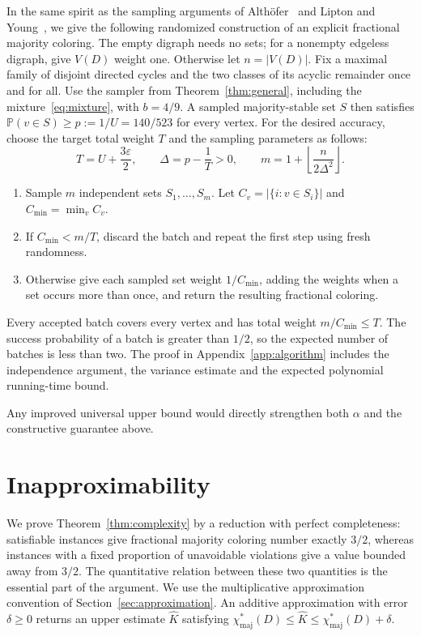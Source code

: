 \documentclass[12pt]{article}
\newcommand{\Pp}{\mathbb P}
\newcommand{\chif}{\chi^*_{\mathrm{maj}}}
\newcommand{\abs}[1]{|#1|}
\begin{document}
In the same spirit as the sampling arguments of Alth\"ofer~\cite{Althofer} and Lipton and Young~\cite{LiptonYoung}, we give the following randomized construction of an explicit fractional majority coloring. The empty digraph needs no sets; for a nonempty edgeless digraph, give \(V(D)\) weight one. Otherwise let \(n=\abs{V(D)}\). Fix a maximal family of disjoint directed cycles and the two classes of its acyclic remainder once and for all. Use the sampler from Theorem~\ref{thm:general}, including the mixture~\eqref{eq:mixture}, with \(b=4/9\). A sampled majority-stable set \(S\) then satisfies \(\Pp(v\in S)\ge p:=1/U=140/523\) for every vertex. For the desired accuracy, choose the target total weight $T$ and the sampling parameters as follows:
\begin{equation}\label{eq:batchparameters}
T=U+\frac{3\varepsilon}{2},\qquad
\Delta=p-\frac1T>0,\qquad
m=1+\left\lfloor\frac{n}{2\Delta^2}\right\rfloor.
\end{equation}
\begin{enumerate}
\item Sample \(m\) independent sets \(S_1,\ldots,S_m\). Let \(C_v=\abs{\{i:v\in S_i\}}\) and \(C_{\min}=\min_v C_v\).
\item If \(C_{\min}<m/T\), discard the batch and repeat the first step using fresh randomness.
\item Otherwise give each sampled set weight \(1/C_{\min}\), adding the weights when a set occurs more than once, and return the resulting fractional coloring.
\end{enumerate}
Every accepted batch covers every vertex and has total weight \(m/C_{\min}\le T\). The success probability of a batch is greater than \(1/2\), so the expected number of batches is less than two. The proof in Appendix~\ref{app:algorithm} includes the independence argument, the variance estimate and the expected polynomial running-time bound.

Any improved universal upper bound would directly strengthen both \(\alpha\) and the constructive guarantee above.

\section{Inapproximability}\label{sec:complexity}
We prove Theorem~\ref{thm:complexity} by a reduction with perfect completeness: satisfiable instances give fractional majority coloring number exactly \(3/2\), whereas instances with a fixed proportion of unavoidable violations give a value bounded away from \(3/2\). The quantitative relation between these two quantities is the essential part of the argument. We use the multiplicative approximation convention of Section~\ref{sec:approximation}. An additive approximation with error \(\delta\ge0\) returns an upper estimate \(\widehat K\) satisfying \(\chif(D)\le\widehat K\le\chif(D)+\delta\).
\end{document}
